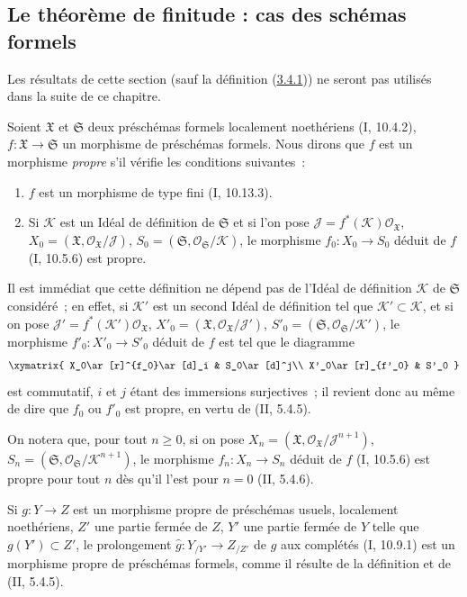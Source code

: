 \subsection{Le théorème de finitude : cas des schémas formels}
\label{subsection:III.3.4-fr}

Les résultats de cette section (sauf la définition
(\hyperref[III.3.4.1-fr]{3.4.1})) ne seront pas utilisés dans la suite de ce
chapitre.

\begin{env}[3.4.1]
\label{III.3.4.1-fr}
Soient $\mathfrak X$ et $\mathfrak S$ deux préschémas formels localement
noethériens (I, 10.4.2), $f:\mathfrak X\to\mathfrak S$ un morphisme de
préschémas formels. Nous dirons que $f$ est un morphisme \emph{propre} s'il
vérifie les conditions suivantes~:
\begin{enumerate}
\item[$1^\circ$] $f$ est un morphisme de type fini (I, 10.13.3).
\item[$2^\circ$] Si $\mathcal K$ est un Idéal de définition de $\mathfrak S$
et si l'on pose
$\mathcal J=f^*(\mathcal K)\mathcal O_{\mathfrak X}$,
$X_0=(\mathfrak X,\mathcal O_{\mathfrak X}/\mathcal J)$,
$S_0=(\mathfrak S,\mathcal O_{\mathfrak S}/\mathcal K)$, le morphisme
$f_0:X_0\to S_0$ déduit de $f$ (I, 10.5.6) est propre.
\end{enumerate}

Il est immédiat que cette définition ne dépend pas de l'Idéal de définition
$\mathcal K$ de $\mathfrak S$ considéré~; en effet, si $\mathcal K'$ est un
second Idéal de définition tel que $\mathcal K'\subset\mathcal K$, et si on
pose $\mathcal J'=f^*(\mathcal K')\mathcal O_{\mathfrak X}$,
$X'_0=(\mathfrak X,\mathcal O_{\mathfrak X}/\mathcal J')$,
$S'_0=(\mathfrak S,\mathcal O_{\mathfrak S}/\mathcal K')$, le morphisme
$f'_0:X'_0\to S'_0$ déduit de $f$ est tel que le diagramme
\[
\xymatrix{
X_0\ar[r]^{f_0}\ar[d]_i & S_0\ar[d]^j\\
X'_0\ar[r]_{f'_0} & S'_0
}
\]
est commutatif, $i$ et $j$ étant des immersions surjectives~; il revient donc
au même de dire que $f_0$ ou $f'_0$ est propre, en vertu de (II, 5.4.5).

On notera que, pour tout $n\geq0$, si on pose
$X_n=(\mathfrak X,\mathcal O_{\mathfrak X}/\mathcal J^{n+1})$,
$S_n=(\mathfrak S,\mathcal O_{\mathfrak S}/\mathcal K^{n+1})$, le morphisme
$f_n:X_n\to S_n$ déduit de $f$ (I, 10.5.6) est propre pour tout $n$ dès qu'il
l'est pour $n=0$ (II, 5.4.6).

Si $g:Y\to Z$ est un morphisme propre de préschémas usuels, localement
noethériens, $Z'$ une partie fermée de $Z$, $Y'$ une partie fermée de $Y$
telle que $g(Y')\subset Z'$, le prolongement
$\widehat g:Y_{/Y'}\to Z_{/Z'}$ de $g$ aux complétés (I, 10.9.1) est un
morphisme propre de préschémas formels, comme il résulte de la définition et
de (II, 5.4.5).


\end{env}

